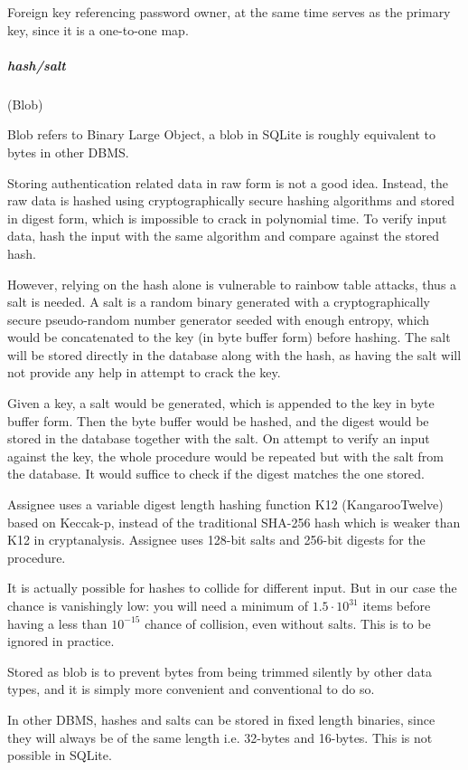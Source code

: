 Foreign key referencing password owner, at the same time serves as the primary key,
since it is a one-to-one map.

\subparagraph{hash/salt}
(Blob) \label{data-layer.design.user.tables.pswd.crypt}

Blob refers to Binary Large Object, a blob in SQLite is roughly equivalent to bytes
in other DBMS.

Storing authentication related data in raw form is not a good idea. Instead, the
raw data is hashed using cryptographically secure hashing algorithms and stored in
digest form, which is impossible to crack in polynomial time. To verify input data,
hash the input with the same algorithm and compare against the stored hash.

However, relying on the hash alone is vulnerable to rainbow table attacks, thus
a salt is needed. A salt is a random binary generated with a cryptographically secure
pseudo-random number generator seeded with enough entropy, which would be
concatenated to the key (in byte buffer form) before hashing. The salt will be stored
directly in the database along with the hash, as having the salt will not
provide any help in attempt to crack the key.

Given a key, a salt would be generated, which is appended to the key in byte
buffer form. Then the byte buffer would be hashed, and the digest would be
stored in the database together with the salt. On attempt to verify an input against
the key, the whole procedure would be repeated but with the salt from the
database. It would suffice to check if the digest matches the one stored.

Assignee uses a variable digest length hashing function K12 (KangarooTwelve) based
on Keccak-p, instead of the traditional SHA-256 hash which is weaker than K12 in
cryptanalysis. Assignee uses 128-bit salts and 256-bit digests for the procedure.

It is actually possible for hashes to collide for different input. But in our
case the chance is vanishingly low: you will need a minimum of $1.5\cdot{}10^{31}$
items before having a less than $10^{-15}$ chance of collision, even without
salts. This is to be ignored in practice.

Stored as blob is to prevent bytes from being trimmed silently by other data types,
and it is simply more convenient and conventional to do so.

\textdagger{} In other DBMS, hashes and salts can be stored in fixed length
binaries, since they will always be of the same length i.e. 32-bytes and 16-bytes.
This is not possible in SQLite.

